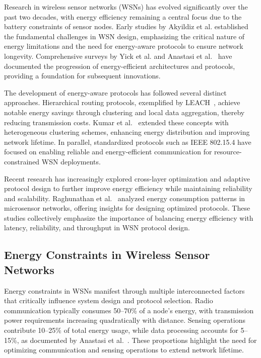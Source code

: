 \documentclass[conference]{IEEEtran}
\begin{document}
Research in wireless sensor networks (WSNs) has evolved significantly over the past two decades, with energy efficiency remaining a central focus due to the battery constraints of sensor nodes. Early studies by Akyildiz et al.\cite{sensor_ref} established the fundamental challenges in WSN design, emphasizing the critical nature of energy limitations and the need for energy-aware protocols to ensure network longevity. Comprehensive surveys by Yick et al.\cite{wsn_survey} and Anastasi et al.~\cite{energy_survey} have documented the progression of energy-efficient architectures and protocols, providing a foundation for subsequent innovations.

The development of energy-aware protocols has followed several distinct approaches. Hierarchical routing protocols, exemplified by LEACH~\cite{leach_orig}, achieve notable energy savings through clustering and local data aggregation, thereby reducing transmission costs. Kumar et al.~\cite{leach_comp} extended these concepts with heterogeneous clustering schemes, enhancing energy distribution and improving network lifetime. In parallel, standardized protocols such as IEEE 802.15.4 have focused on enabling reliable and energy-efficient communication for resource-constrained WSN deployments.

Recent research has increasingly explored cross-layer optimization and adaptive protocol design to further improve energy efficiency while maintaining reliability and scalability. Raghunathan et al.~\cite{wsn_energy} analyzed energy consumption patterns in microsensor networks, offering insights for designing optimized protocols. These studies collectively emphasize the importance of balancing energy efficiency with latency, reliability, and throughput in WSN protocol design.

\subsection{Energy Constraints in Wireless Sensor Networks}

Energy constraints in WSNs manifest through multiple interconnected factors that critically influence system design and protocol selection. Radio communication typically consumes 50--70\% of a node’s energy, with transmission power requirements increasing quadratically with distance. Sensing operations contribute 10--25\% of total energy usage, while data processing accounts for 5--15\%, as documented by Anastasi et al.~\cite{energy_survey}. These proportions highlight the need for optimizing communication and sensing operations to extend network lifetime.
\end{document}
